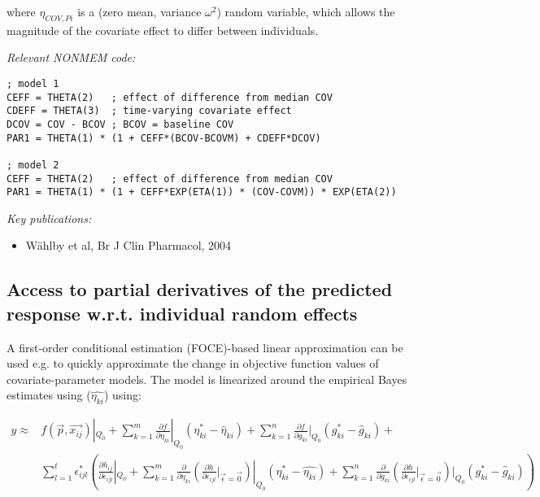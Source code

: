 \documentclass[a4paper,11pt]{article}
\begin{document}
\noindent where $\eta_{COV,Pi}$ is a (zero mean, variance $\omega^2$)
random variable, which allows the magnitude of the covariate effect to
differ between individuals.

\vspace{10pt}
\noindent \emph{Relevant NONMEM code:}
\begin{lstlisting}
; model 1
CEFF = THETA(2)   ; effect of difference from median COV
CDEFF = THETA(3)  ; time-varying covariate effect
DCOV = COV - BCOV ; BCOV = baseline COV
PAR1 = THETA(1) * (1 + CEFF*(BCOV-BCOVM) + CDEFF*DCOV)

; model 2
CEFF = THETA(2)   ; effect of difference from median COV
PAR1 = THETA(1) * (1 + CEFF*EXP(ETA(1)) * (COV-COVM)) * EXP(ETA(2))
\end{lstlisting}

\noindent \emph{Key publications:}
\begin{itemize}
\item W\"ahlby et al, Br J Clin Pharmacol, 2004
\end{itemize}

\subsection{Access to partial derivatives of the predicted response w.r.t. individual random effects}
A first-order conditional estimation (FOCE)-based linear approximation
can be used e.g. to quickly approximate the change in objective
function values of covariate-parameter models. The model is linearized
around the empirical Bayes estimates using ($\hat{\eta_{ki}}$) using:

\begin{displaymath}
\begin{split}
  y \approx & f(\vec{p},\vec{x_{ij}}) |_{Q_{0}} +
     \sum_{k=1}^{m} \frac{\partial f}{\partial \eta_{ki}} |_{Q_{0}} (\eta^*_{ki}-\hat{\eta}_{ki}) +
     \sum_{k=1}^{n} \frac{\partial f}{\partial g_{ki}} |_{Q_{0}} (g^*_{ki} - \hat{g}_{ki}) + \\
    & \sum_{l=1}^{t} \epsilon^*_{ijl} \left( \frac{\partial h_{ij}}{\partial \epsilon_{ijl}} |_{Q_0} +  \sum_{k=1}^{m} \frac{\partial}{\partial \eta_{ki}}
    \left( \frac{\partial h}{\partial \epsilon_{ijl}} |_{\vec{\epsilon}=\vec{0}} \right) |_{Q_{0}} ( \eta^*_{ki} - \hat{\eta_{ki}} ) + \sum_{k=1}^{n} \frac{\partial}{\partial g_{ki}} \left( \frac{\partial h}{\partial \epsilon_{ijl}} |_{\vec{\epsilon} = \vec{0}} \right) |_{Q_0} (g^*_{ki}-\hat{g}_{ki})  \right)
\end{split}
\end{displaymath}
\end{document}
